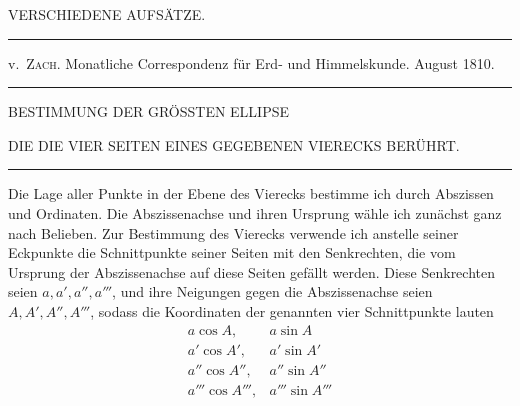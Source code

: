 \clearpage
{}
\begin{center}
{\Large VERSCHIEDENE AUFSÄTZE.}\par\bigskip
\rule{.85\textwidth}{.3pt}\par
v.\ \textsc{Zach}. Monatliche Correspondenz für Erd- und Himmelskunde. August 1810.\par
\rule{.85\textwidth}{.3pt}\par\bigskip
BESTIMMUNG DER GRÖSSTEN ELLIPSE\par\medskip
DIE DIE VIER SEITEN EINES GEGEBENEN VIERECKS BERÜHRT.\par\bigskip
\rule{.15\textwidth}{.3pt}
\end{center}
\hspace*{\parindent}Die Lage aller Punkte in der Ebene des Vierecks bestimme ich durch Abszissen und Ordinaten. Die Abszissenachse und ihren Ursprung wähle ich zunächst ganz nach Belieben. Zur Bestimmung des Vierecks verwende ich anstelle seiner Eckpunkte die Schnittpunkte seiner Seiten mit den Senkrechten, die vom Ursprung der Abszissenachse auf diese Seiten gefällt werden. Diese Senkrechten seien \(a,a',a'',a'''\), und ihre Neigungen gegen die Abszissenachse seien \(A,A',A'',A'''\), sodass die Koordinaten der genannten vier Schnittpunkte lauten
\[
\begin{array}{ll}
a\cos A,&a\sin A\\
a'\cos A',&a'\sin A'\\
a''\cos A'',&a''\sin A''\\
a'''\cos A''',&a'''\sin A'''
\end{array}
\]
